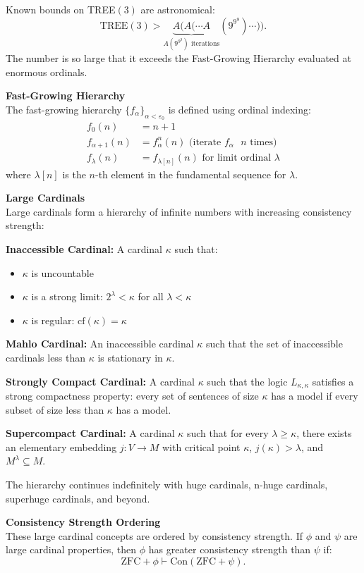 \begin{technical}
Known bounds on TREE$(3)$ are astronomical:
$$
\text{TREE}(3) > \underbrace{A(A(\cdots A}_{A(9^{9^9}) \text{ iterations}}(9^{9^9})\cdots)).
$$
The number is so large that it exceeds the Fast-Growing Hierarchy evaluated at enormous ordinals.

\textbf{Fast-Growing Hierarchy}\\[0.5em]
The fast-growing hierarchy $\{f_\alpha\}_{\alpha < \varepsilon_0}$ is defined using ordinal indexing:
\begin{align}
f_0(n) &= n + 1\\
f_{\alpha+1}(n) &= f_\alpha^n(n) \text{ (iterate $f_\alpha$ $n$ times)}\\
f_\lambda(n) &= f_{\lambda[n]}(n) \text{ for limit ordinal $\lambda$}
\end{align}
where $\lambda[n]$ is the $n$-th element in the fundamental sequence for $\lambda$.

\textbf{Large Cardinals}\\[0.5em]
Large cardinals form a hierarchy of infinite numbers with increasing consistency strength:

\textbf{Inaccessible Cardinal:} A cardinal $\kappa$ such that:
\begin{itemize}
\item $\kappa$ is uncountable
\item $\kappa$ is a strong limit: $2^\lambda < \kappa$ for all $\lambda < \kappa$  
\item $\kappa$ is regular: $\text{cf}(\kappa) = \kappa$
\end{itemize}

\textbf{Mahlo Cardinal:} An inaccessible cardinal $\kappa$ such that the set of inaccessible cardinals less than $\kappa$ is stationary in $\kappa$.

\textbf{Strongly Compact Cardinal:} A cardinal $\kappa$ such that the logic $L_{\kappa,\kappa}$ satisfies a strong compactness property: every set of sentences of size $\kappa$ has a model if every subset of size less than $\kappa$ has a model.

\textbf{Supercompact Cardinal:} A cardinal $\kappa$ such that for every $\lambda \geq \kappa$, there exists an elementary embedding $j: V \rightarrow M$ with critical point $\kappa$, $j(\kappa) > \lambda$, and $M^\lambda \subseteq M$.

The hierarchy continues indefinitely with huge cardinals, n-huge cardinals, superhuge cardinals, and beyond.

\textbf{Consistency Strength Ordering}\\[0.5em]
These large cardinal concepts are ordered by consistency strength. If $\phi$ and $\psi$ are large cardinal properties, then $\phi$ has greater consistency strength than $\psi$ if:
$$
\text{ZFC} + \phi \vdash \text{Con}(\text{ZFC} + \psi).
$$


\end{technical}
